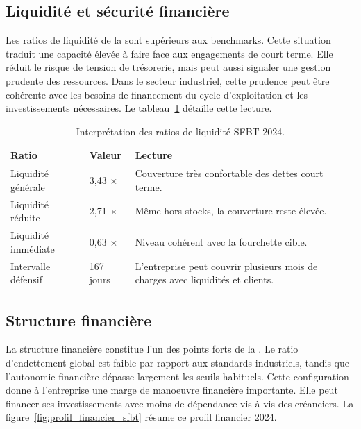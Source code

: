 \subsection{Liquidité et sécurité financière}
\par Les ratios de liquidité de la \sfbt sont supérieurs aux benchmarks. Cette
situation traduit une capacité élevée à faire face aux engagements de court
terme. Elle réduit le risque de tension de trésorerie, mais peut aussi signaler
une gestion prudente des ressources. Dans le secteur industriel, cette prudence
peut être cohérente avec les besoins de financement du cycle d'exploitation et
les investissements nécessaires. Le
tableau~\ref{tab:liquidite_interpretation} détaille cette lecture.

\begin{table}[H]
\centering
\caption[Interprétation des ratios de liquidité]{Interprétation des ratios de liquidité SFBT 2024.}
\label{tab:liquidite_interpretation}
\begin{tabularx}{\linewidth}{|p{3.5cm}|p{2.2cm}|X|}
\hline
\textbf{Ratio} & \textbf{Valeur} & \textbf{Lecture} \\ \hline
Liquidité générale & 3,43 $\times$ & Couverture très confortable des dettes court terme. \\ \hline
Liquidité réduite & 2,71 $\times$ & Même hors stocks, la couverture reste élevée. \\ \hline
Liquidité immédiate & 0,63 $\times$ & Niveau cohérent avec la fourchette cible. \\ \hline
Intervalle défensif & 167 jours & L'entreprise peut couvrir plusieurs mois de charges avec liquidités et clients. \\ \hline
\end{tabularx}
\end{table}

\subsection{Structure financière}
\par La structure financière constitue l'un des points forts de la \sfbt. Le
ratio d'endettement global est faible par rapport aux standards industriels,
tandis que l'autonomie financière dépasse largement les seuils habituels. Cette
configuration donne à l'entreprise une marge de manoeuvre financière importante.
Elle peut financer ses investissements avec moins de dépendance vis-à-vis des
créanciers. La figure~\ref{fig:profil_financier_sfbt} résume ce profil financier
2024.

